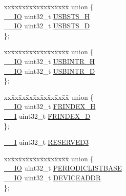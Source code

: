 \begin{DoxyCompactItemize}
\begin{tabbing}
\end{tabbing}\item 
\begin{tabbing}
xx\=xx\=xx\=xx\=xx\=xx\=xx\=xx\=xx\=\kill
union \{\\
\>\hyperlink{core__sc300_8h_aec43007d9998a0a0e01faede4133d6be}{\_\_IO} uint32\_t \hyperlink{struct_l_p_c___u_s_b_h_s___t_a9f3177408908a0e4e66a38da36b0426a}{USBSTS\_H}\\
\>\hyperlink{core__sc300_8h_aec43007d9998a0a0e01faede4133d6be}{\_\_IO} uint32\_t \hyperlink{struct_l_p_c___u_s_b_h_s___t_a70ecdb6ad5a6faf72e9699e947476984}{USBSTS\_D}\\
\}; \\

\end{tabbing}\item 
\begin{tabbing}
xx\=xx\=xx\=xx\=xx\=xx\=xx\=xx\=xx\=\kill
union \{\\
\>\hyperlink{core__sc300_8h_aec43007d9998a0a0e01faede4133d6be}{\_\_IO} uint32\_t \hyperlink{struct_l_p_c___u_s_b_h_s___t_ae220aa62017ef8d69b1f080a73880195}{USBINTR\_H}\\
\>\hyperlink{core__sc300_8h_aec43007d9998a0a0e01faede4133d6be}{\_\_IO} uint32\_t \hyperlink{struct_l_p_c___u_s_b_h_s___t_a69db2526568fcdc5e7445076b3e5da8a}{USBINTR\_D}\\
\}; \\

\end{tabbing}\item 
\begin{tabbing}
xx\=xx\=xx\=xx\=xx\=xx\=xx\=xx\=xx\=\kill
union \{\\
\>\hyperlink{core__sc300_8h_aec43007d9998a0a0e01faede4133d6be}{\_\_IO} uint32\_t \hyperlink{struct_l_p_c___u_s_b_h_s___t_a4a6c4e632b445888e26e29241d730861}{FRINDEX\_H}\\
\>\hyperlink{core__sc300_8h_af63697ed9952cc71e1225efe205f6cd3}{\_\_I} uint32\_t \hyperlink{struct_l_p_c___u_s_b_h_s___t_ae8200c4e716e50fbcb136df7c365b1b0}{FRINDEX\_D}\\
\}; \\

\end{tabbing}\item 
\hyperlink{core__sc300_8h_af63697ed9952cc71e1225efe205f6cd3}{\+\_\+\+\_\+I} uint32\+\_\+t \hyperlink{struct_l_p_c___u_s_b_h_s___t_a1b6265d0fb05d46074ff380f637d31d6}{R\+E\+S\+E\+R\+V\+E\+D3}
\item 
\begin{tabbing}
xx\=xx\=xx\=xx\=xx\=xx\=xx\=xx\=xx\=\kill
union \{\\
\>\hyperlink{core__sc300_8h_aec43007d9998a0a0e01faede4133d6be}{\_\_IO} uint32\_t \hyperlink{struct_l_p_c___u_s_b_h_s___t_ad78771a5c7b0bc5734743d5382ac2bf5}{PERIODICLISTBASE}\\
\>\hyperlink{core__sc300_8h_aec43007d9998a0a0e01faede4133d6be}{\_\_IO} uint32\_t \hyperlink{struct_l_p_c___u_s_b_h_s___t_a7d5578d0ad837825ee144e56c0ee0b78}{DEVICEADDR}\\
\}; \\


\end{tabbing}
\end{DoxyCompactItemize}
